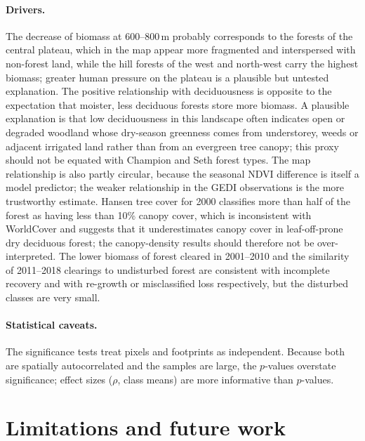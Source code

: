\documentclass[11pt,a4paper]{article}
\begin{document}
\paragraph{Drivers.} The decrease of biomass at 600--800\,m probably corresponds to the forests
of the central plateau, which in the map appear more fragmented and interspersed with
non-forest land, while the hill forests of the west and north-west carry the highest biomass;
greater human pressure on the plateau is a plausible but untested explanation. The positive relationship with
deciduousness is opposite to the expectation that moister, less deciduous forests store more
biomass. A plausible explanation is that low deciduousness in this landscape often indicates
open or degraded woodland whose dry-season greenness comes from understorey, weeds or adjacent
irrigated land rather than from an evergreen tree canopy; this proxy should not be equated
with Champion and Seth forest types. The map relationship is also partly circular, because the
seasonal NDVI difference is itself a model predictor; the weaker relationship in the GEDI
observations is the more trustworthy estimate. Hansen tree cover for 2000 classifies more than
half of the forest as having less than 10\% canopy cover, which is inconsistent with WorldCover
and suggests that it underestimates canopy cover in leaf-off-prone dry deciduous forest; the
canopy-density results should therefore not be over-interpreted. The lower biomass of forest
cleared in 2001--2010 and the similarity of 2011--2018 clearings to undisturbed forest are
consistent with incomplete recovery and with re-growth or misclassified loss respectively, but
the disturbed classes are very small.

\paragraph{Statistical caveats.} The significance tests treat pixels and footprints as
independent. Because both are spatially autocorrelated and the samples are large, the
$p$-values overstate significance; effect sizes ($\rho$, class means) are more informative than
$p$-values.

\section{Limitations and future work}
\end{document}
